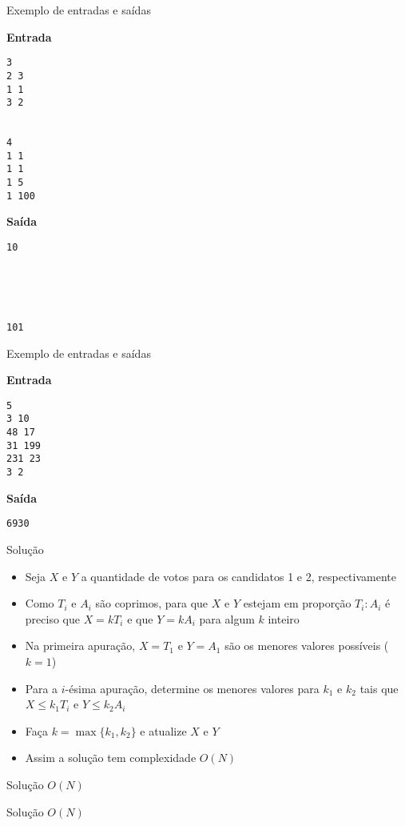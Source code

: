 \begin{frame}[fragile]{Exemplo de entradas e saídas}

\begin{minipage}[t]{0.45\textwidth}
\textbf{Entrada}
\begin{verbatim}
3
2 3
1 1
3 2


4
1 1
1 1
1 5
1 100
\end{verbatim}
\end{minipage}
\begin{minipage}[t]{0.5\textwidth}
\textbf{Saída}
\begin{verbatim}
10





101
\end{verbatim}
\end{minipage}
\end{frame}

\begin{frame}[fragile]{Exemplo de entradas e saídas}

\begin{minipage}[t]{0.45\textwidth}
\textbf{Entrada}
\begin{verbatim}
5
3 10
48 17
31 199
231 23
3 2
\end{verbatim}
\end{minipage}
\begin{minipage}[t]{0.5\textwidth}
\textbf{Saída}
\begin{verbatim}
6930
\end{verbatim}
\end{minipage}
\end{frame}


\begin{frame}[fragile]{Solução}

    \begin{itemize}
        \item Seja $X$ e $Y$ a quantidade de votos para os candidatos 1 e 2, respectivamente

        \item Como $T_i$ e $A_i$ são coprimos, para que $X$ e $Y$ estejam em proporção $T_i : A_i$
            é preciso que $X = kT_i$ e que $Y = kA_i$ para algum $k$ inteiro

        \item Na primeira apuração, $X = T_1$ e $Y = A_1$ são os menores valores possíveis
            ($k = 1$)

        \item Para a $i$-ésima apuração, determine os menores valores para $k_1$ e $k_2$ tais que
            $X \leq k_1T_i$ e $Y \leq k_2A_i$

        \item Faça $k = \max\{ k_1, k_2 \}$ e atualize $X$ e $Y$ 

        \item Assim a solução tem complexidade $O(N)$
    
    \end{itemize}

\end{frame}

\begin{frame}[fragile]{Solução $O(N)$}
\end{frame}

\begin{frame}[fragile]{Solução $O(N)$}
\end{frame}
